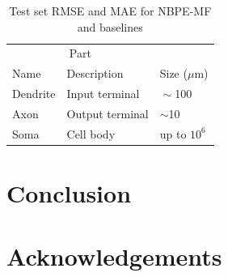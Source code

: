 \documentclass{article}
\begin{document}
\begin{table}
  \caption{Test set RMSE and MAE for NBPE-MF and baselines}
  \label{sample-table}
  \centering
  \begin{tabular}{lll}
    \toprule
    \multicolumn{2}{c}{Part}                   \\
    \cmidrule(r){1-2}
    Name     & Description     & Size ($\mu$m) \\
    \midrule
    Dendrite & Input terminal  & $\sim$100     \\
    Axon     & Output terminal & $\sim$10      \\
    Soma     & Cell body       & up to $10^6$  \\
    \bottomrule
  \end{tabular}
\end{table}

\section{Conclusion}

\section*{Acknowledgements}



\end{document}
